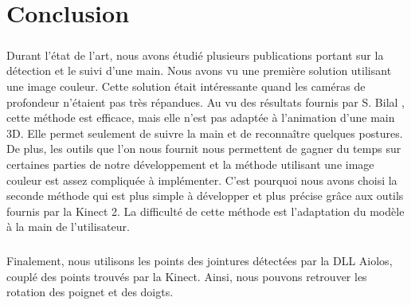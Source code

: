 \chapter*{Conclusion}
\paragraph{}
Durant l'état de l'art, nous avons étudié plusieurs publications portant sur la détection et le suivi
d'une main. Nous avons vu une première solution utilisant une image couleur. Cette solution était
intéressante quand les caméras de profondeur n'étaient pas très répandues. Au vu des résultats fournis par S. Bilal
\cite{haarlike}, cette méthode est efficace, mais elle n'est pas adaptée à l'animation d'une main 3D. Elle permet seulement
de suivre la main et de reconnaître quelques postures. De plus, les outils que l'on nous fournit nous permettent
de gagner du temps sur certaines parties de notre développement et la méthode utilisant une image couleur
est assez compliquée à implémenter. C'est pourquoi nous avons choisi la seconde méthode qui est plus
simple à développer et plus précise grâce aux outils fournis par la Kinect 2. La difficulté de cette méthode
est l'adaptation du modèle à la main de l'utilisateur.\\


\paragraph{}
Finalement, nous utilisons les points des jointures détectées par la DLL Aiolos, couplé des points 
trouvés par la Kinect. Ainsi, nous pouvons retrouver les rotation des poignet et des doigts. 

